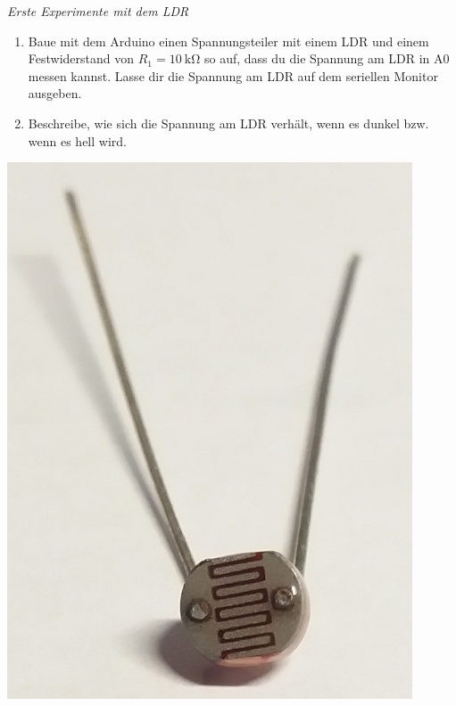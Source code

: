 \begin{minipage}{0.84\textwidth}
	\begin{aufgabe}\emph{Erste Experimente mit dem LDR}
		\vspace{-0.3\baselineskip}
		\begin{enumerate}[label=\alph*), itemsep=0ex, parsep=0mm]
			\item Baue mit dem Arduino einen Spannungsteiler mit einem LDR und einem Festwiderstand von $R_1=\SI{10}{\kilo\ohm}$ so auf, dass du die Spannung am LDR in A0 messen kannst. Lasse dir die Spannung am LDR auf dem seriellen Monitor ausgeben.
			\item Beschreibe, wie sich die Spannung am LDR verhält, wenn es dunkel bzw. wenn es hell wird.
		\end{enumerate}
	\end{aufgabe}
\end{minipage}
\hfill
\begin{minipage}{0.14\textwidth}
		\centering
		\includegraphics[width=0.9\textwidth]{./pics/ldr.jpg}
\end{minipage}

